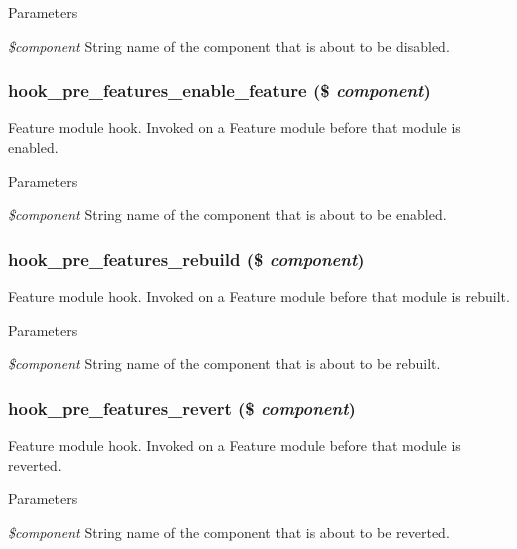 \begin{DoxyParams}{Parameters}
\item[{\em \$component}]String name of the component that is about to be disabled. \end{DoxyParams}
\hypertarget{group__features__module__hooks_gaa07fa9cd3758939db8a7be925e3d2a42}{
\subsubsection[{hook\_\-pre\_\-features\_\-enable\_\-feature}]{\setlength{\rightskip}{0pt plus 5cm}hook\_\-pre\_\-features\_\-enable\_\-feature (\$ {\em component})}}
\label{group__features__module__hooks_gaa07fa9cd3758939db8a7be925e3d2a42}
Feature module hook. Invoked on a Feature module before that module is enabled.


\begin{DoxyParams}{Parameters}
\item[{\em \$component}]String name of the component that is about to be enabled. \end{DoxyParams}
\hypertarget{group__features__module__hooks_ga237e63a64bdf40cd41907ed20eb25a6a}{
\subsubsection[{hook\_\-pre\_\-features\_\-rebuild}]{\setlength{\rightskip}{0pt plus 5cm}hook\_\-pre\_\-features\_\-rebuild (\$ {\em component})}}
\label{group__features__module__hooks_ga237e63a64bdf40cd41907ed20eb25a6a}
Feature module hook. Invoked on a Feature module before that module is rebuilt.


\begin{DoxyParams}{Parameters}
\item[{\em \$component}]String name of the component that is about to be rebuilt. \end{DoxyParams}
\hypertarget{group__features__module__hooks_ga4a6a86e3c70a00dc2b669163bfbbc0f5}{
\subsubsection[{hook\_\-pre\_\-features\_\-revert}]{\setlength{\rightskip}{0pt plus 5cm}hook\_\-pre\_\-features\_\-revert (\$ {\em component})}}
\label{group__features__module__hooks_ga4a6a86e3c70a00dc2b669163bfbbc0f5}
Feature module hook. Invoked on a Feature module before that module is reverted.


\begin{DoxyParams}{Parameters}
\item[{\em \$component}]String name of the component that is about to be reverted. \end{DoxyParams}
